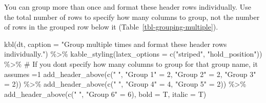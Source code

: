 \documentclass[
  letterpaper,
  DIV=11,
  numbers=noendperiod]{scrartcl}
\newenvironment{Shaded}{\begin{snugshade}}{\end{snugshade}}
\newcommand{\AttributeTok}[1]{\textcolor[rgb]{0.40,0.45,0.13}{#1}}
\newcommand{\CommentTok}[1]{\textcolor[rgb]{0.37,0.37,0.37}{#1}}
\newcommand{\DecValTok}[1]{\textcolor[rgb]{0.68,0.00,0.00}{#1}}
\newcommand{\FunctionTok}[1]{\textcolor[rgb]{0.28,0.35,0.67}{#1}}
\newcommand{\NormalTok}[1]{\textcolor[rgb]{0.00,0.23,0.31}{#1}}
\newcommand{\OtherTok}[1]{\textcolor[rgb]{0.00,0.23,0.31}{#1}}
\newcommand{\SpecialCharTok}[1]{\textcolor[rgb]{0.37,0.37,0.37}{#1}}
\newcommand{\StringTok}[1]{\textcolor[rgb]{0.13,0.47,0.30}{#1}}
\begin{document}
You can group more than once and format these header rows individually.
Use the total number of rows to specify how many columns to group, not
the number of rows in the grouped row below it
(Table~\ref{tbl-grouping-multiple}).

\begin{Shaded}
\begin{Highlighting}[]
\FunctionTok{kbl}\NormalTok{(dt, }
    \AttributeTok{caption =} \StringTok{"Group multiple times and format these header rows individually."}\NormalTok{) }\SpecialCharTok{\%\textgreater{}\%}
  \FunctionTok{kable\_styling}\NormalTok{(}\AttributeTok{latex\_options =} \FunctionTok{c}\NormalTok{(}\StringTok{"striped"}\NormalTok{, }\StringTok{"hold\_position"}\NormalTok{)) }\SpecialCharTok{\%\textgreater{}\%} 
  \CommentTok{\# If you don\textquotesingle{}t specify how many columns to group for that group name, it assumes =1}
  \FunctionTok{add\_header\_above}\NormalTok{(}\FunctionTok{c}\NormalTok{(}\StringTok{" "}\NormalTok{, }\StringTok{"Group 1"} \OtherTok{=} \DecValTok{2}\NormalTok{, }\StringTok{"Group 2"} \OtherTok{=} \DecValTok{2}\NormalTok{, }\StringTok{"Group 3"} \OtherTok{=} \DecValTok{2}\NormalTok{)) }\SpecialCharTok{\%\textgreater{}\%}
  \FunctionTok{add\_header\_above}\NormalTok{(}\FunctionTok{c}\NormalTok{(}\StringTok{" "}\NormalTok{, }\StringTok{"Group 4"} \OtherTok{=} \DecValTok{4}\NormalTok{, }\StringTok{"Group 5"} \OtherTok{=} \DecValTok{2}\NormalTok{)) }\SpecialCharTok{\%\textgreater{}\%}
  \FunctionTok{add\_header\_above}\NormalTok{(}\FunctionTok{c}\NormalTok{(}\StringTok{" "}\NormalTok{, }\StringTok{"Group 6"} \OtherTok{=} \DecValTok{6}\NormalTok{), }\AttributeTok{bold =}\NormalTok{ T, }\AttributeTok{italic =}\NormalTok{ T)}
\end{Highlighting}
\end{Shaded}
\end{document}
